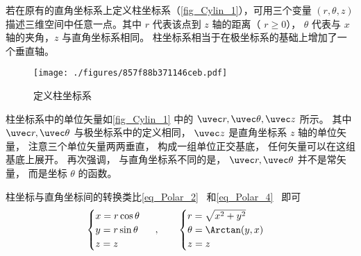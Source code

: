 
若在原有的直角坐标系上定义柱坐标系（\autoref{fig_Cylin_1}），可用三个变量 $(r, \theta, z)$ 描述三维空间中任意一点。其中 $r$ 代表该点到 $z$ 轴的距离（ $r \geqslant 0$）， $\theta$ 代表与 $x$ 轴的夹角，$z$ 与直角坐标系相同。 柱坐标系相当于在极坐标系的基础上增加了一个垂直轴。

\begin{figure}[ht]
\centering
\texttt{[image: ./figures/857f88b371146ceb.pdf]}
\caption{定义柱坐标系}\label{fig_Cylin_1}
\end{figure}

柱坐标系中的单位矢量如\autoref{fig_Cylin_1} 中的 $\uvec r,\uvec \theta ,\uvec z$ 所示。 其中 $\uvec r, \uvec \theta$ 与极坐标系中的定义相同， $\uvec z$ 是直角坐标系 $z$ 轴的单位矢量， 注意三个单位矢量两两垂直， 构成一组单位正交基底， 任何矢量可以在这组基底上展开。 再次强调， 与直角坐标系不同的是， $\uvec r, \uvec \theta$ 并不是常矢量， 而是坐标 $\theta$ 的函数。

柱坐标与直角坐标间的转换类比\autoref{eq_Polar_2}~ 和\autoref{eq_Polar_4}~ 即可
\begin{equation}
\begin{cases}
x = r\cos \theta \\
y = r\sin \theta \\
z = z
\end{cases}~,
\qquad
\begin{cases}
r = \sqrt {x^2 + y^2} \\
\theta  = \Arctan(y, x)\\
z = z
\end{cases}
\end{equation}
